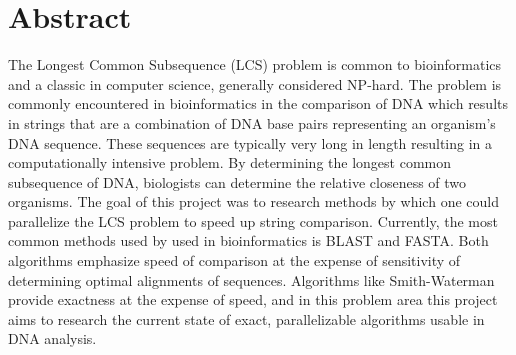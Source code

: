 \section{Abstract}
The Longest Common Subsequence (LCS) problem is common to bioinformatics and a classic in computer science, generally considered NP-hard.  The problem is commonly encountered in bioinformatics in the comparison of DNA which results in strings that are a combination of DNA base pairs representing an organism's DNA sequence. These sequences are typically very long in length resulting in a computationally intensive problem. By determining the longest common subsequence of DNA, biologists can determine the relative closeness of two organisms. The goal of this project was to research methods by which one could parallelize the LCS problem to speed up string comparison. Currently, the most common methods used by used in bioinformatics is BLAST and FASTA. Both algorithms emphasize speed of comparison at the expense of sensitivity of determining optimal alignments of sequences. Algorithms like Smith-Waterman provide exactness at the expense of speed, and in this problem area this project aims to research the current state of exact, parallelizable algorithms usable in DNA analysis.

